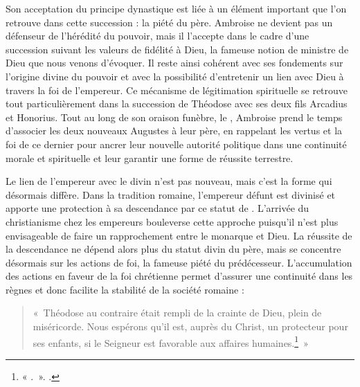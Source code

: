 \bigskip

Son acceptation du principe dynastique est liée à un élément important que l'on retrouve dans cette succession : la piété du père. Ambroise ne devient pas un défenseur de l’hérédité du pouvoir, mais il l'accepte dans le cadre d’une succession suivant les valeurs de fidélité à Dieu, la fameuse notion de ministre de Dieu que nous venons d'évoquer. Il reste ainsi cohérent avec ses fondements sur l'origine divine du pouvoir et avec la possibilité d'entretenir un lien avec Dieu à travers la foi de l'empereur. Ce mécanisme de légitimation spirituelle se retrouve tout particulièrement dans la succession de Théodose avec ses deux fils Arcadius et Honorius. Tout au long de son oraison funèbre, le , Ambroise prend le temps d'associer les deux nouveaux Augustes à leur père, en rappelant les vertus et la foi de ce dernier pour ancrer leur nouvelle autorité politique dans une continuité morale et spirituelle et leur garantir une forme de réussite terrestre.

\bigskip

Le lien de l'empereur avec le divin n'est pas nouveau, mais c'est la forme qui désormais diffère. Dans la tradition romaine, l'empereur défunt est divinisé et apporte une protection à sa descendance par ce statut de . L'arrivée du christianisme chez les empereurs bouleverse cette approche puisqu'il n'est plus envisageable de faire un rapprochement entre le monarque et Dieu. La réussite de la descendance ne dépend alors plus du statut divin du père, mais se concentre désormais sur les actions de foi, la fameuse piété du prédécesseur. L'accumulation des actions en faveur de la foi chrétienne permet d'assurer une continuité dans les règnes et donc facilite la stabilité de la société romaine :

\bigskip

\begin{quote}
«~Théodose au contraire était rempli de la crainte de Dieu, plein de miséricorde. Nous espérons qu’il est, auprès du Christ, un protecteur pour ses enfants, si le Seigneur est favorable aux affaires humaines.\footnote{« .~». \cite[]{ambroise_mort_theodose}.}~»
\end{quote}

\bigskip

